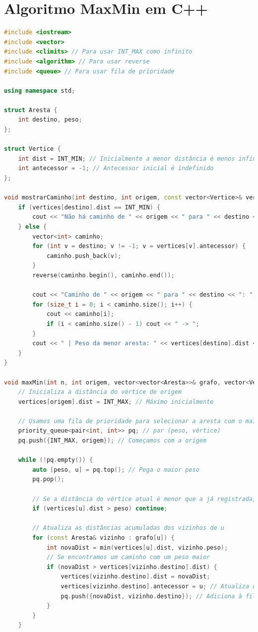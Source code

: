 \documentclass{article}
\begin{document}
\section{Algoritmo MaxMin em C++}
\begin{lstlisting}[language=c++ ,caption = Exemplo C++]
#include <iostream>
#include <vector>
#include <climits> // Para usar INT_MAX como infinito
#include <algorithm> // Para usar reverse
#include <queue> // Para usar fila de prioridade

using namespace std;

struct Aresta {
    int destino, peso;
};

struct Vertice {
    int dist = INT_MIN; // Inicialmente a menor distância é menos infinito
    int antecessor = -1; // Antecessor inicial é indefinido
};

void mostrarCaminho(int destino, int origem, const vector<Vertice>& vertices) {
    if (vertices[destino].dist == INT_MIN) {
        cout << "Não há caminho de " << origem << " para " << destino << endl;
    } else {
        vector<int> caminho;
        for (int v = destino; v != -1; v = vertices[v].antecessor) {
            caminho.push_back(v);
        }
        reverse(caminho.begin(), caminho.end());

        cout << "Caminho de " << origem << " para " << destino << ": ";
        for (size_t i = 0; i < caminho.size(); i++) {
            cout << caminho[i];
            if (i < caminho.size() - 1) cout << " -> ";
        }
        cout << " | Peso da menor aresta: " << vertices[destino].dist << endl;
    }
}

void maxMin(int n, int origem, vector<vector<Aresta>>& grafo, vector<Vertice>& vertices) {
    // Inicializa a distância do vértice de origem
    vertices[origem].dist = INT_MAX; // Máximo inicialmente

    // Usamos uma fila de prioridade para selecionar a aresta com o maior peso
    priority_queue<pair<int, int>> pq; // par (peso, vértice)
    pq.push({INT_MAX, origem}); // Começamos com a origem

    while (!pq.empty()) {
        auto [peso, u] = pq.top(); // Pega o maior peso
        pq.pop();

        // Se a distância do vértice atual é menor que a já registrada, ignoramos
        if (vertices[u].dist > peso) continue;

        // Atualiza as distâncias acumuladas dos vizinhos de u
        for (const Aresta& vizinho : grafo[u]) {
            int novaDist = min(vertices[u].dist, vizinho.peso);
            // Se encontramos um caminho com um peso maior
            if (novaDist > vertices[vizinho.destino].dist) {
                vertices[vizinho.destino].dist = novaDist;
                vertices[vizinho.destino].antecessor = u; // Atualiza o antecessor
                pq.push({novaDist, vizinho.destino}); // Adiciona à fila de prioridade
            }
        }
    }


\end{lstlisting}
\end{document}
